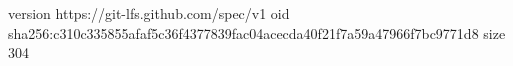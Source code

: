 version https://git-lfs.github.com/spec/v1
oid sha256:c310c335855afaf5c36f4377839fac04acecda40f21f7a59a47966f7bc9771d8
size 304
